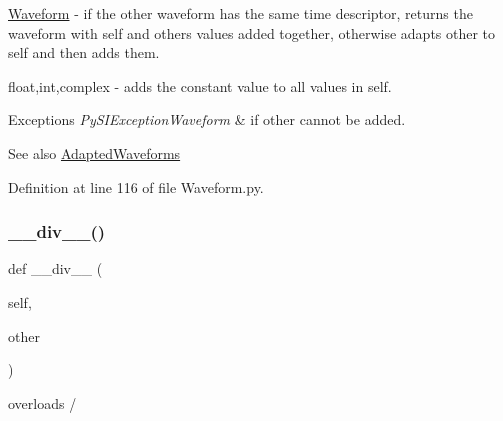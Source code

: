 \begin{DoxyItemize}
\item \hyperlink{classSignalIntegrity_1_1TimeDomain_1_1Waveform_1_1Waveform_1_1Waveform}{Waveform} -\/ if the other waveform has the same time descriptor, returns the waveform with self and others values added together, otherwise adapts other to self and then adds them.
\item float,int,complex -\/ adds the constant value to all values in self. 
\begin{DoxyExceptions}{Exceptions}
{\em Py\+S\+I\+Exception\+Waveform} & if other cannot be added. \\
\hline
\end{DoxyExceptions}
\begin{DoxySeeAlso}{See also}
\hyperlink{namespaceSignalIntegrity_1_1TimeDomain_1_1Waveform_1_1AdaptedWaveforms}{Adapted\+Waveforms} 
\end{DoxySeeAlso}

\end{DoxyItemize}

Definition at line 116 of file Waveform.\+py.

\mbox{\label{classSignalIntegrity_1_1TimeDomain_1_1Waveform_1_1Waveform_1_1Waveform_afeae6ad6a777e389fe51032a0fd81882}} 
\subsubsection{\texorpdfstring{\+\_\+\+\_\+div\+\_\+\+\_\+()}{\_\_div\_\_()}}
{\footnotesize\ttfamily def \+\_\+\+\_\+div\+\_\+\+\_\+ (\begin{DoxyParamCaption}\item[{}]{self,  }\item[{}]{other }\end{DoxyParamCaption})}



overloads / 


